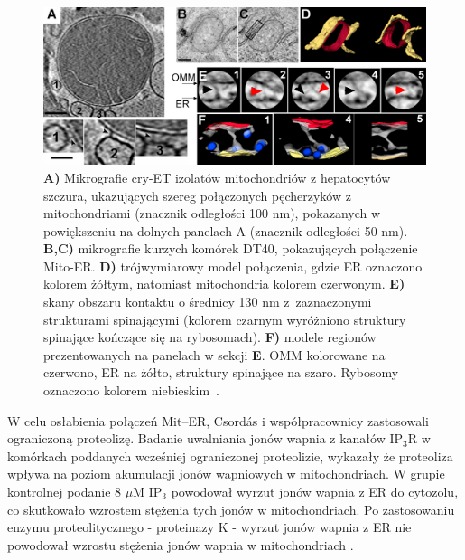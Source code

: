 \begin{figure}[ht]
\centering
\includegraphics[width=1\textwidth]{rysunki/rozdzial_1/MAMfoto3.png}
\caption[MAM - kompleks mitochondrialno-retikularny, białka spinające]{\textbf{A)} Mikrografie cry-ET izolatów mitochondriów z hepatocytów szczura, ukazujących szereg połączonych pęcherzyków z mitochondriami (znacznik odległości 100 nm), pokazanych w powiększeniu na dolnych panelach A (znacznik odległości 50 nm). \textbf{B,C)} mikrografie kurzych komórek DT40, pokazujących połączenie Mito-ER. \textbf{D)} trójwymiarowy model połączenia, gdzie ER oznaczono kolorem żółtym, natomiast mitochondria kolorem czerwonym. \textbf{E)} skany obszaru kontaktu o średnicy 130 nm z~zaznaczonymi strukturami spinającymi (kolorem czarnym wyróżniono struktury spinające kończące się na rybosomach). \textbf{F)} modele regionów prezentowanych na panelach w sekcji \textbf{E}. OMM kolorowane na czerwono, ER na żółto, struktury spinające na szaro. Rybosomy oznaczono kolorem niebieskim~\cite{Csordas2006}.}
\label{fig:MAMfoto3}
\end{figure}

W celu osłabienia połączeń Mit--ER, Csord\'{a}s i współpracownicy \cite{Csordas2006} zastosowali ograniczoną proteolizę. Badanie uwalniania jonów wapnia z kanałów IP$_3$R w komórkach poddanych wcześniej ograniczonej proteolizie, wykazały że proteoliza wpływa na poziom akumulacji jonów wapniowych w mitochondriach. W grupie kontrolnej podanie 8 $\mu$M IP$_3$ powodował wyrzut jonów wapnia z ER do cytozolu, co skutkowało wzrostem stężenia tych jonów w mitochondriach. Po zastosowaniu enzymu proteolitycznego - proteinazy K - wyrzut jonów wapnia z ER nie powodował wzrostu stężenia jonów wapnia w mitochondriach \cite{Csordas2006}.

